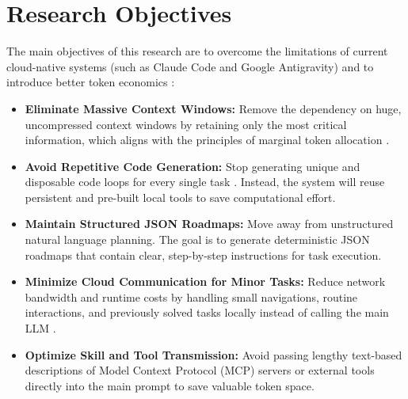\section{Research Objectives}
The main objectives of this research are to overcome the limitations of current cloud-native systems (such as Claude Code and Google Antigravity)\cite{anthropic_claude_code_works, google_antigravity_ide} and to introduce better token economics \cite{token_economics, ai_tokenomics}:\\
\begin{itemize}
\item \textbf{Eliminate Massive Context Windows:} Remove the dependency on huge, uncompressed context windows by retaining only the most critical information, which aligns with the principles of marginal token allocation \cite{marginal_token}.
\item \textbf{Avoid Repetitive Code Generation:} Stop generating unique and disposable code loops for every single task \cite{claude_code_dive}. Instead, the system will reuse persistent and pre-built local tools to save computational effort.
\item \textbf{Maintain Structured JSON Roadmaps:} Move away from unstructured natural language planning. The goal is to generate deterministic JSON roadmaps that contain clear, step-by-step instructions for task execution.
\item \textbf{Minimize Cloud Communication for Minor Tasks:} Reduce network bandwidth and runtime costs by handling small navigations, routine interactions, and previously solved tasks locally instead of calling the main LLM \cite{efficient_agents}.
\item \textbf{Optimize Skill and Tool Transmission:} Avoid passing lengthy text-based descriptions of Model Context Protocol (MCP) servers or external tools directly into the main prompt to save valuable token space.
\end{itemize}

